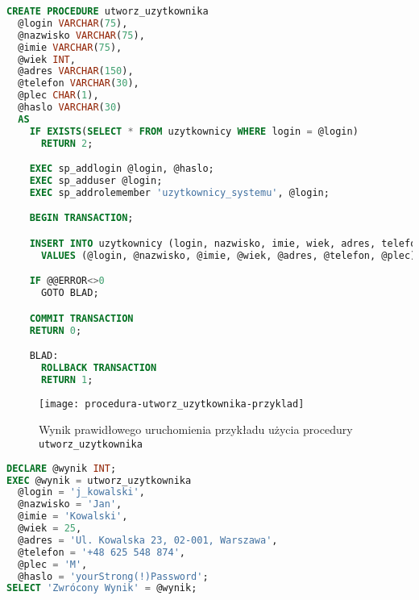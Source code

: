 \begin{lstlisting}[language=SQL, caption={Skrypt tworzący procedurę składowaną \texttt{utworz\_uzytkownika}}, label={lst:procedura-utworz_uzytkownika}]
CREATE PROCEDURE utworz_uzytkownika
  @login VARCHAR(75),
  @nazwisko VARCHAR(75),
  @imie VARCHAR(75),
  @wiek INT,
  @adres VARCHAR(150),
  @telefon VARCHAR(30),
  @plec CHAR(1),
  @haslo VARCHAR(30)
  AS
    IF EXISTS(SELECT * FROM uzytkownicy WHERE login = @login)
      RETURN 2;

    EXEC sp_addlogin @login, @haslo;
    EXEC sp_adduser @login;
    EXEC sp_addrolemember 'uzytkownicy_systemu', @login;

    BEGIN TRANSACTION;

    INSERT INTO uzytkownicy (login, nazwisko, imie, wiek, adres, telefon, plec)
      VALUES (@login, @nazwisko, @imie, @wiek, @adres, @telefon, @plec);

    IF @@ERROR<>0
      GOTO BLAD;

    COMMIT TRANSACTION
    RETURN 0;

    BLAD:
      ROLLBACK TRANSACTION
      RETURN 1;
\end{lstlisting}

\begin{figure}[h]
	\centering
    \texttt{[image: procedura-utworz\_uzytkownika-przyklad]}
	\caption{Wynik prawidłowego uruchomienia przykładu użycia procedury \texttt{utworz\_uzytkownika}}
	\label{fig:lista_niepopularnych_obiektow}
\end{figure}

\begin{lstlisting}[language=SQL, caption={Przykład użycia procedury \texttt{utworz\_uzytkownika}}, label={lst:procedura-utworz_uzytkownika-przyklad}]
DECLARE @wynik INT;
EXEC @wynik = utworz_uzytkownika
  @login = 'j_kowalski',
  @nazwisko = 'Jan',
  @imie = 'Kowalski',
  @wiek = 25,
  @adres = 'Ul. Kowalska 23, 02-001, Warszawa',
  @telefon = '+48 625 548 874',
  @plec = 'M',
  @haslo = 'yourStrong(!)Password';
SELECT 'Zwrócony Wynik' = @wynik;
\end{lstlisting}
